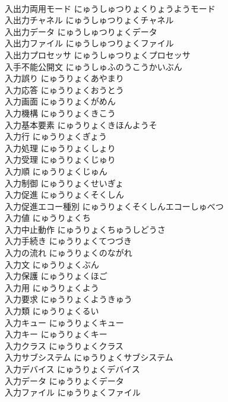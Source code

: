 \documentclass[8pt]{extreport}
\begin{document}
\begin{CJK}{UTF8}{min}
\\	入出力両用モード	にゅうしゅつりょくりょうようモード	
\\	入出力チャネル	にゅうしゅつりょくチャネル	
\\	入出力データ	にゅうしゅつりょくデータ	
\\	入出力ファイル	にゅうしゅつりょくファイル	
\\	入出力プロセッサ	にゅうしゅつりょくプロセッサ	
\\	入手不能公開文	にゅうしゅふのうこうかいぶん	
\\	入力誤り	にゅうりょくあやまり	
\\	入力応答	にゅうりょくおうとう	
\\	入力画面	にゅうりょくがめん	
\\	入力機構	にゅうりょくきこう	
\\	入力基本要素	にゅうりょくきほんようそ	
\\	入力行	にゅうりょくぎょう	
\\	入力処理	にゅうりょくしょり	
\\	入力受理	にゅうりょくじゅり	
\\	入力順	にゅうりょくじゅん	
\\	入力制御	にゅうりょくせいぎょ	
\\	入力促進	にゅうりょくそくしん	
\\	入力促進エコー種別	にゅうりょくそくしんエコーしゅべつ	
\\	入力値	にゅうりょくち	
\\	入力中止動作	にゅうりょくちゅうしどうさ	
\\	入力手続き	にゅうりょくてつづき	
\\	入力の流れ	にゅうりょくのながれ	
\\	入力文	にゅうりょくぶん	
\\	入力保護	にゅうりょくほご	
\\	入力用	にゅうりょくよう	
\\	入力要求	にゅうりょくようきゅう	
\\	入力類	にゅうりょくるい	
\\	入力キュー	にゅうりょくキュー	
\\	入力キー	にゅうりょくキー	
\\	入力クラス	にゅうりょくクラス	
\\	入力サブシステム	にゅうりょくサブシステム	
\\	入力デバイス	にゅうりょくデバイス	
\\	入力データ	にゅうりょくデータ	
\\	入力ファイル	にゅうりょくファイル	

\end{CJK}
\end{document}
